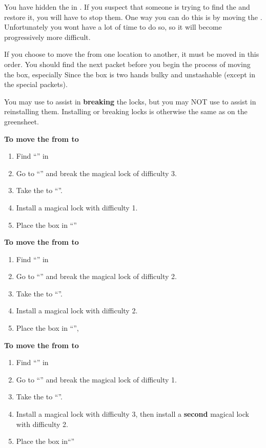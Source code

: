 \documentclass[green]{NeptuneBall}
\begin{document}
\name{\gMoveMusicBox{}}

You have hidden the \iMusicBox{} in \sPacketA{\MYloc{}}. If you suspect that someone is trying to find the \iMusicBox{\MYname} and restore it, you will have to stop them. One way you can do this is by moving the \iMusicBox{\MYname}. Unfortunately you wont have a lot of time to do so, so it will become progressively more difficult. 

If you choose to move the \iMusicBox{\MYname} from one location to another, it must be moved in this order. You should find the next packet before you begin the process of moving the box, especially Since the box is two hands bulky and unstashable (except in the special packets).

You may use \aLesserDispel{} to assist in {\bf breaking} the locks, but you may NOT use \aLesserDispel{} to assist in reinstalling them. Installing or breaking locks is otherwise the same as on the \gDecking{} greensheet. 

{\bf To move the \iMusicBox{\MYname} from \sPacketA{\MYloc{}} to \sPacketB{\MYloc{}}}
\begin{enumerate}
  \item Find ``\sPacketB{}'' in \sPacketB{\MYloc{}}
  \item Go to ``\sPacketA{}'' and break the magical lock of difficulty 3. 
  \item Take the \iMusicBox{\MYname} to ``\sPacketB{}''. 
  \item Install a magical lock with difficulty 1.
	\item Place the box in ``\sPacketB{}''
\end{enumerate}

{\bf To move the \iMusicBox{\MYname} from \sPacketB{\MYloc{}} to \sPacketC{\MYloc{}}}
\begin{enumerate}
  \item Find ``\sPacketC{}'' in \sPacketC{\MYloc{}}
  \item Go to ``\sPacketB{}'' and break the magical lock of difficulty 2. 
  \item Take the \iMusicBox{\MYname} to ``\sPacketC{}''. 
  \item Install a magical lock with difficulty 2.
	\item Place the box in ``\sPacketC{}'', 
\end{enumerate}

{\bf To move the \iMusicBox{\MYname} from \sPacketC{\MYloc{}} to \sPacketD{\MYloc{}}}
\begin{enumerate}
  \item Find ``\sPacketD{}'' in \sPacketD{\MYloc{}}
  \item Go to ``\sPacketC{}'' and break the magical lock of difficulty 1. 
  \item Take the \iMusicBox{\MYname} to ``\sPacketD{}''. 
  \item Install a magical lock with difficulty 3, then install a {\bf second} magical lock with difficulty 2.
	\item Place the box in``\sPacketD{}''
\end{enumerate}
\end{document}
